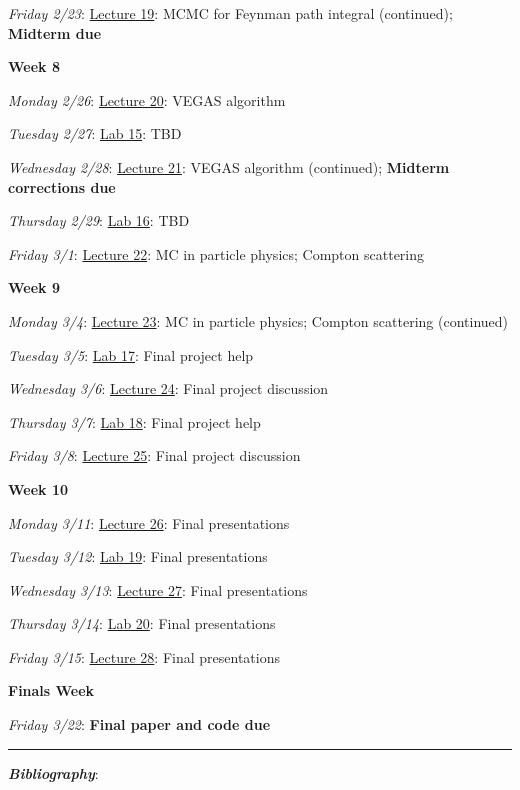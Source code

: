 \documentclass[12pt]{article}
\begin{document}
\emph{Friday 2/23}: \underline{Lecture 19}: MCMC for Feynman path integral (continued); \textbf{Midterm due}

\noindent\textbf{Week 8}

\emph{Monday 2/26}: \underline{Lecture 20}: VEGAS algorithm

\emph{Tuesday 2/27}: \underline{Lab 15}: TBD

\emph{Wednesday 2/28}: \underline{Lecture 21}: VEGAS algorithm (continued); \textbf{Midterm corrections due}

\emph{Thursday 2/29}: \underline{Lab 16}: TBD

\emph{Friday 3/1}: \underline{Lecture 22}: MC in particle physics; Compton scattering

\noindent\textbf{Week 9}

\emph{Monday 3/4}: \underline{Lecture 23}: MC in particle physics; Compton scattering (continued)

\emph{Tuesday 3/5}: \underline{Lab 17}: Final project help

\emph{Wednesday 3/6}: \underline{Lecture 24}: Final project discussion

\emph{Thursday 3/7}: \underline{Lab 18}: Final project help

\emph{Friday 3/8}: \underline{Lecture 25}: Final project discussion

\noindent\textbf{Week 10}

\emph{Monday 3/11}: \underline{Lecture 26}: Final presentations

\emph{Tuesday 3/12}: \underline{Lab 19}: Final presentations

\emph{Wednesday 3/13}: \underline{Lecture 27}: Final presentations

\emph{Thursday 3/14}: \underline{Lab 20}: Final presentations

\emph{Friday 3/15}: \underline{Lecture 28}: Final presentations

\noindent\textbf{Finals Week}

\emph{Friday 3/22}: \textbf{Final paper and code due}

\begin{center}
  \rule{\textwidth}{0.5pt}
\end{center}
\nocite{*}

\noindent\textbf{\emph{Bibliography}}:\\
\printbibliography[heading=none]
\end{document}
